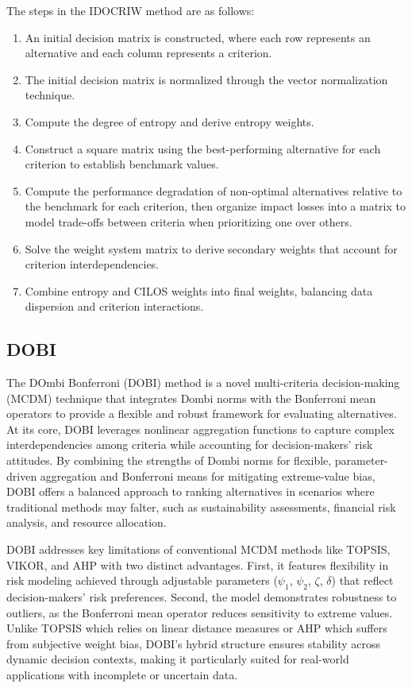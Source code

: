 \documentclass{article}
\begin{document}
The steps in the IDOCRIW method are as follows:
\begin{enumerate}[label=\alph*)]
\item An initial decision matrix is constructed, where each row represents an alternative and each column represents a criterion.
\item The initial decision matrix is normalized through the vector normalization technique.
\item Compute the degree of entropy and derive entropy weights.
\item Construct a square matrix using the best-performing alternative for each criterion to establish benchmark values.
\item Compute the performance degradation of non-optimal alternatives relative to the benchmark for each criterion, then organize impact losses into a matrix to model trade-offs between criteria when prioritizing one over others.
\item Solve the weight system matrix to derive secondary weights that account for criterion interdependencies.
\item Combine entropy and CILOS weights into final weights, balancing data dispersion and criterion interactions.
\end{enumerate}

\subsection{DOBI}
The DOmbi Bonferroni (DOBI) method is a novel multi-criteria decision-making (MCDM) technique that integrates Dombi norms with the Bonferroni mean operators to provide a flexible and robust framework for evaluating alternatives. At its core, DOBI leverages nonlinear aggregation functions to capture complex interdependencies among criteria while accounting for decision-makers' risk attitudes. By combining the strengths of Dombi norms for flexible, parameter-driven aggregation and Bonferroni means for mitigating extreme-value bias, DOBI offers a balanced approach to ranking alternatives in scenarios where traditional methods may falter, such as sustainability assessments, financial risk analysis, and resource allocation.

DOBI addresses key limitations of conventional MCDM methods like TOPSIS, VIKOR, and AHP with two distinct advantages. First, it features flexibility in risk modeling achieved through adjustable parameters ($\psi_{1}$, $\psi_{2}$, $\zeta$, $\delta$) that reflect decision-makers' risk preferences. Second, the model demonstrates robustness to outliers, as the Bonferroni mean operator reduces sensitivity to extreme values. Unlike TOPSIS which relies on linear distance measures or AHP which suffers from subjective weight bias, DOBI's hybrid structure ensures stability across dynamic decision contexts, making it particularly suited for real-world applications with incomplete or uncertain data.
\end{document}
